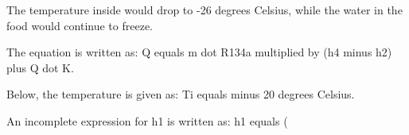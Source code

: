 The temperature inside would drop to -26 degrees Celsius, while the water in the food would continue to freeze.

The equation is written as:  
Q equals m dot R134a multiplied by (h4 minus h2) plus Q dot K.  

Below, the temperature is given as:  
Ti equals minus 20 degrees Celsius.  

An incomplete expression for h1 is written as:  
h1 equals (